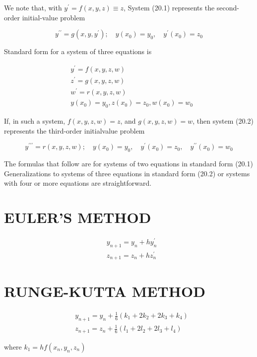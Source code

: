 \documentclass[10pt]{article}
\begin{document}
We note that, with $y^{\prime}=f(x, y, z) \equiv z$, System (20.1) represents the second-order initial-value problem

$$
y^{\prime \prime}=g\left(x, y, y^{\prime}\right) ; \quad y\left(x_{0}\right)=y_{0}, \quad y^{\prime}\left(x_{0}\right)=z_{0}
$$

Standard form for a system of three equations is


\begin{align*}
& y^{\prime}=f(x, y, z, w) \\
& z^{\prime}=g(x, y, z, w)  \tag{20.2}\\
& w^{\prime}=r(x, y, z, w) \\
& y\left(x_{0}\right)=y_{0}, z\left(x_{0}\right)=z_{0}, w\left(x_{0}\right)=w_{0}
\end{align*}


If, in such a system, $f(x, y, z, w)=z$, and $g(x, y, z, w)=w$, then system (20.2) represents the third-order initialvalue problem

$$
y^{\prime \prime \prime}=r(x, y, z, w) ; \quad y\left(x_{0}\right)=y_{0}, \quad y^{\prime}\left(x_{0}\right)=z_{0}, \quad y^{\prime \prime}\left(x_{0}\right)=w_{0}
$$

The formulas that follow are for systems of two equations in standard form (20.1) Generalizations to systems of three equations in standard form (20.2) or systems with four or more equations are straightforward.

\section*{EULER'S METHOD}

\begin{align*}
& y_{n+1}=y_{n}+h y_{n}^{\prime}  \tag{20.3}\\
& z_{n+1}=z_{n}+h z_{n}^{\prime}
\end{align*}


\section*{RUNGE-KUTTA METHOD}

\begin{align*}
& y_{n+1}=y_{n}+\frac{1}{6}\left(k_{1}+2 k_{2}+2 k_{3}+k_{4}\right)  \tag{20.4}\\
& z_{n+1}=z_{n}+\frac{1}{6}\left(l_{1}+2 l_{2}+2 l_{3}+l_{4}\right)
\end{align*}


where $k_{1}=h f\left(x_{n}, y_{n}, z_{n}\right)$
\end{document}

